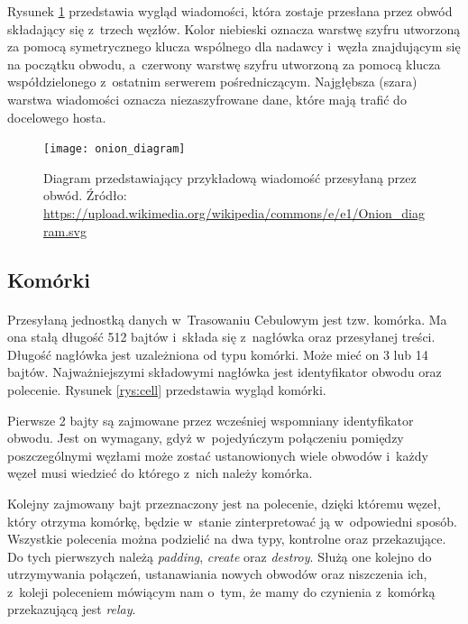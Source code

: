 Rysunek \ref{rys:onion_diagram} przedstawia wygląd wiadomości, która zostaje przesłana przez obwód składający się z~trzech węzłów. Kolor niebieski oznacza warstwę szyfru utworzoną za pomocą symetrycznego klucza wspólnego dla nadawcy i~węzła znajdującym się na początku obwodu, a~czerwony warstwę szyfru utworzoną za pomocą klucza współdzielonego z~ostatnim serwerem pośredniczącym. Najgłębsza (szara) warstwa wiadomości oznacza niezaszyfrowane dane, które mają trafić do docelowego hosta.

\begin{figure}
  \centering
  \texttt{[image: onion\_diagram]} 
  \caption[Caption for LOF]{
    Diagram przedstawiający przykładową wiadomość przesyłaną przez obwód.\newline
    Źródło: \url{https://upload.wikimedia.org/wikipedia/commons/e/e1/Onion_diagram.svg}}
  \label{rys:onion_diagram}
\end{figure}

\subsection{Komórki}\paragraph{}
Przesyłaną jednostką danych w~Trasowaniu Cebulowym jest tzw. komórka. Ma ona stałą długość 512 bajtów i~składa się z~nagłówka oraz przesyłanej treści. Długość nagłówka jest uzależniona od typu komórki. Może mieć on 3 lub 14 bajtów. Najważniejszymi składowymi nagłówka jest identyfikator obwodu oraz polecenie. Rysunek \ref{rys:cell} przedstawia wygląd komórki.

Pierwsze 2 bajty są zajmowane przez wcześniej wspomniany identyfikator obwodu. Jest on wymagany, gdyż w~pojedyńczym połączeniu pomiędzy poszczególnymi węzłami może zostać ustanowionych wiele obwodów i~każdy węzeł musi wiedzieć do którego z~nich należy komórka.

Kolejny zajmowany bajt przeznaczony jest na polecenie, dzięki któremu węzeł, który otrzyma komórkę, będzie w~stanie zinterpretować ją w~odpowiedni sposób. Wszystkie polecenia można podzielić na dwa typy, kontrolne oraz przekazujące. Do tych pierwszych należą \textit{padding}, \textit{create} oraz \textit{destroy}. Służą one kolejno do utrzymywania połączeń, ustanawiania nowych obwodów oraz niszczenia ich, z~koleji poleceniem mówiącym nam o~tym, że mamy do czynienia z~komórką przekazującą jest \textit{relay}.

